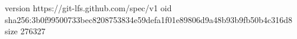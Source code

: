 version https://git-lfs.github.com/spec/v1
oid sha256:3b0f99500733bec8208753834e59defa1f01e89806d9a48b93b9fb50b4c316d8
size 276327
